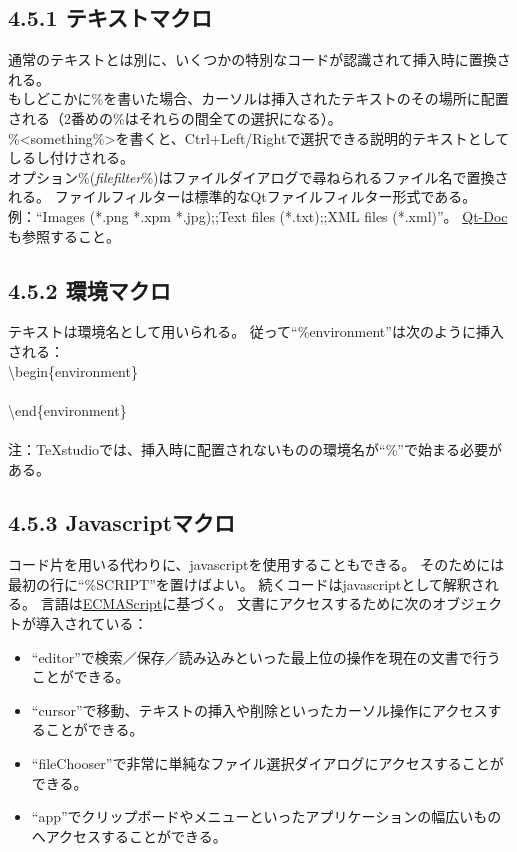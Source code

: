 \documentclass[]{book}
\begin{document}
\subsection{4.5.1 テキストマクロ}

通常のテキストとは別に、いくつかの特別なコードが認識されて挿入時に置換される。\\
もしどこかに\%\textbar{}を書いた場合、カーソルは挿入されたテキストのその場所に配置される（2番めの\%\textbar{}はそれらの間全ての選択になる）。\\
\%\textless{}something\%\textgreater{}を書くと、Ctrl+Left/Rightで選択できる説明的テキストとしてしるし付けされる。\\
オプション\%(\emph{filefilter}\%)はファイルダイアログで尋ねられるファイル名で置換される。
ファイルフィルターは標準的なQtファイルフィルター形式である。\\
例：``Images (*.png *.xpm *.jpg);;Text files (*.txt);;XML files
(*.xml)''。
\href{http://qt-project.org/doc/qt-4.8/qfiledialog.html\#getOpenFileName}{Qt-Doc}も参照すること。

\subsection{4.5.2 環境マクロ}

テキストは環境名として用いられる。
従って``\%environment''は次のように挿入される：\\
\textbackslash{}begin\{environment\}\\ \\
\textbackslash{}end\{environment\}\\ \\
注：TeXstudioでは、挿入時に配置されないものの環境名が``\%''で始まる必要がある。

\subsection{4.5.3 Javascriptマクロ}

コード片を用いる代わりに、javascriptを使用することもできる。
そのためには最初の行に``\%SCRIPT''を置けばよい。
続くコードはjavascriptとして解釈される。
言語は\href{http://www.ecmascript.org/index.php}{ECMAScript}に基づく。
文書にアクセスするために次のオブジェクトが導入されている：

\begin{itemize}
\item
  ``editor''で検索／保存／読み込みといった最上位の操作を現在の文書で行うことができる。
\item
  ``cursor''で移動、テキストの挿入や削除といったカーソル操作にアクセスすることができる。
\item
  ``fileChooser''で非常に単純なファイル選択ダイアログにアクセスすることができる。
\item
  ``app''でクリップボードやメニューといったアプリケーションの幅広いものへアクセスすることができる。
\end{itemize}
\end{document}

